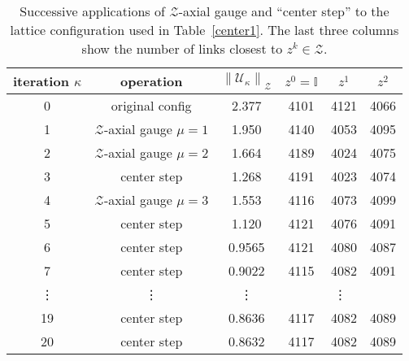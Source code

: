 \documentclass[preprint,aps,prd]{revtex4-2}
\newcommand{\zentrum}{\mathcal{Z}}       %
\newcommand{\config}{\mathcal{U}}
\begin{document}
\begin{table}
  \caption{Successive applications of $\zentrum$-axial gauge
    and ``center step'' to the lattice configuration
    used in Table~\ref{center1}.
    The last three columns show the number of links closest
    to $z^k \in \zentrum$.
    \label{center2}}
  \begin{tabular}{c|c|c|ccc}
    iteration $\kappa$ & operation & $\left\lVert \config_\kappa \right\rVert_\zentrum$
     & $z^0=\mathbb{I}$ & $z^1$ & $z^2$ \\
    \hline
    0 & original config              & 2.377  & 4101 & 4121 & 4066\\
    1 & $\zentrum$-axial gauge $\mu=1$& 1.950  & 4140 & 4053 & 4095\\
    2 & $\zentrum$-axial gauge $\mu=2$& 1.664  & 4189 & 4024 & 4075\\
    3 & center step                  & 1.268  & 4191 & 4023 & 4074\\
    4 & $\zentrum$-axial gauge $\mu=3$& 1.553  & 4116 & 4073 & 4099\\
    5 & center step                  & 1.120  & 4121 & 4076 & 4091\\
    6 & center step                  & 0.9565 & 4121 & 4080 & 4087\\
    7 & center step                  & 0.9022 & 4115 & 4082 & 4091\\
    \vdots & \vdots & \vdots & \multicolumn{3}{c}{\vdots}\\
    19 & center step                 & 0.8636 & 4117 & 4082 & 4089\\
    20 & center step                 & 0.8632 & 4117 & 4082 & 4089\\
  \end{tabular}
  \end{table}
\end{document}
